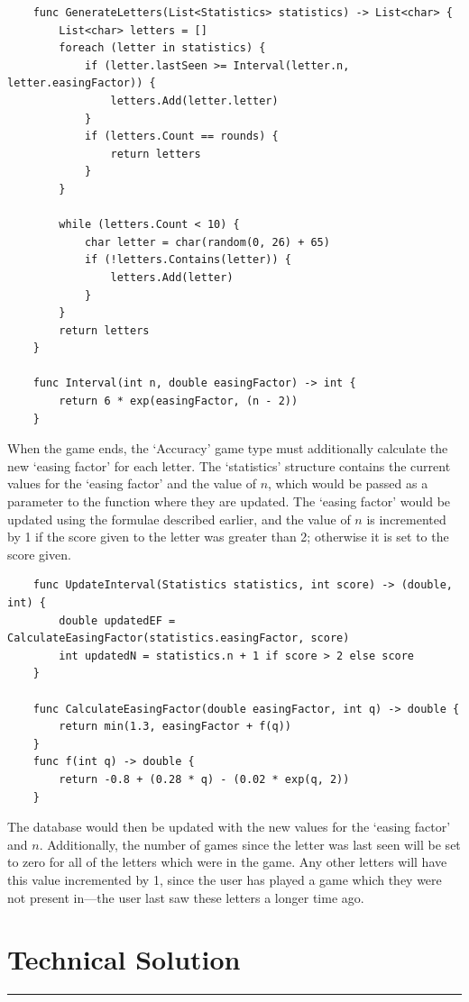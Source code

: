 \documentclass{article}
\begin{document}
\begin{verbatim}
    func GenerateLetters(List<Statistics> statistics) -> List<char> {
        List<char> letters = []
        foreach (letter in statistics) {
            if (letter.lastSeen >= Interval(letter.n, letter.easingFactor)) {
                letters.Add(letter.letter)
            }
            if (letters.Count == rounds) {
                return letters
            }
        }

        while (letters.Count < 10) {
            char letter = char(random(0, 26) + 65)
            if (!letters.Contains(letter)) {
                letters.Add(letter)
            }
        }
        return letters
    }

    func Interval(int n, double easingFactor) -> int {
        return 6 * exp(easingFactor, (n - 2))
    }
\end{verbatim}

When the game ends, the `Accuracy' game type must additionally calculate the new `easing factor' for each letter. The `statistics' structure contains the current values for the `easing factor' and the value of \(n\), which would be passed as a parameter to the function where they are updated. The `easing factor' would be updated using the formulae described earlier, and the value of \(n\) is incremented by 1 if the score given to the letter was greater than 2; otherwise it is set to the score given.

\begin{verbatim}
    func UpdateInterval(Statistics statistics, int score) -> (double, int) {
        double updatedEF = CalculateEasingFactor(statistics.easingFactor, score)
        int updatedN = statistics.n + 1 if score > 2 else score
    }

    func CalculateEasingFactor(double easingFactor, int q) -> double {
        return min(1.3, easingFactor + f(q))
    }
    func f(int q) -> double {
        return -0.8 + (0.28 * q) - (0.02 * exp(q, 2))
    }
\end{verbatim}

The database would then be updated with the new values for the `easing factor' and \(n\). Additionally, the number of games since the letter was last seen will be set to zero for all of the letters which were in the game. Any other letters will have this value incremented by 1, since the user has played a game which they were not present in---the user last saw these letters a longer time ago.

\newpage
\section{Technical Solution}
\noindent\rule{\textwidth}{0.2pt}
\end{document}
